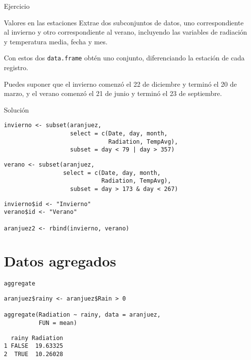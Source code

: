\documentclass[xcolor={usenames,svgnames,dvipsnames}]{beamer}
\begin{document}
\begin{frame}[label={sec:org9d9e6d2},fragile]{Ejercicio}
 \begin{block}{Valores en las estaciones}
Extrae dos subconjuntos de datos, uno correspondiente al invierno y otro correspondiente al verano, incluyendo las variables de radiación y temperatura media, fecha y mes. 

Con estos dos \texttt{data.frame} obtén uno conjunto, diferenciando la estación de cada registro.

Puedes suponer que el invierno comenzó el 22 de diciembre y terminó el 20 de marzo, y el verano comenzó el 21 de junio y terminó el 23 de septiembre.
\end{block}
\end{frame}


\begin{frame}[label={sec:orgf6d9d48},fragile]{Solución}
 \lstset{language=r,label= ,caption= ,captionpos=b,numbers=none}
\begin{lstlisting}
invierno <- subset(aranjuez,
                   select = c(Date, day, month, 
                              Radiation, TempAvg),
                   subset = day < 79 | day > 357)
\end{lstlisting}

\lstset{language=r,label= ,caption= ,captionpos=b,numbers=none}
\begin{lstlisting}
verano <- subset(aranjuez,
                 select = c(Date, day, month,
                            Radiation, TempAvg),
                   subset = day > 173 & day < 267)
\end{lstlisting}

\lstset{language=r,label= ,caption= ,captionpos=b,numbers=none}
\begin{lstlisting}
invierno$id <- "Invierno"
verano$id <- "Verano"

aranjuez2 <- rbind(invierno, verano)
\end{lstlisting}
\end{frame}


\section{Datos agregados}
\label{sec:orgfab00f3}

\begin{frame}[label={sec:org781c883},fragile]{\texttt{aggregate}}
 \lstset{language=r,label= ,caption= ,captionpos=b,numbers=none}
\begin{lstlisting}
aranjuez$rainy <- aranjuez$Rain > 0

aggregate(Radiation ~ rainy, data = aranjuez,
          FUN = mean)
\end{lstlisting}

\begin{verbatim}
  rainy Radiation
1 FALSE  19.63325
2  TRUE  10.26028
\end{verbatim}
\end{frame}
\end{document}
